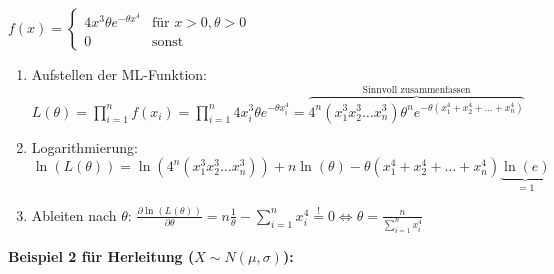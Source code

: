 \(f(x) = \begin{cases}
    4x^3\theta e^{-\theta x^4} & \text{für } x>0, \theta>0\\
    0 & \text{sonst}
\end{cases}\)\\

\begin{enumerate}
    \item Aufstellen der ML-Funktion: \(L(\theta)=\prod_{i=1}^{n}f(x_i)=\prod_{i=1}^{n}4x_i^3\theta e^{-\theta x_i^4}=\overbrace{4^n(x_1^3x_2^3\hdots x_n^3)\theta^n e^{-\theta(x_1^4+x_2^4+\hdots+x_n^4)}}^{\text{Sinnvoll zusammenfassen}}\)
    \item Logarithmierung: \(\ln(L(\theta))=\ln(4^n(x_1^3x_2^3\hdots x_n^3))+n\ln(\theta)-\theta(x_1^4+x_2^4+\hdots+x_n^4)\underbrace{\ln(e)}_{=1}\)
    \item Ableiten nach \(\theta\): \(\frac{\partial \ln(L(\theta))}{\partial \theta}=n\frac{1}{\theta}-\sum_{i=1}^{n}x_i^4\stackrel{!}{=}0\Leftrightarrow \theta=\frac{n}{\sum_{i=1}^{n}x_i^4}\)
\end{enumerate}



\textbf{Beispiel 2 für Herleitung (\(X\sim N(\mu, \sigma)\)):}


